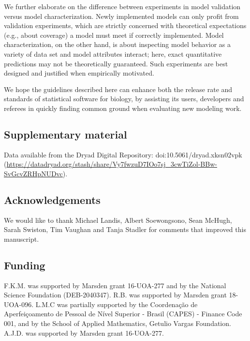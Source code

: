 \documentclass[oneside]{article}
\begin{document}
We further elaborate on the difference between experiments in model validation versus model characterization.
Newly implemented models can only profit from validation experiments, which are strictly concerned with theoretical expectations (e.g., about coverage) a model must meet if correctly implemented.
Model characterization, on the other hand, is about inspecting model behavior as a variety of data set and model attributes interact; here, exact quantitative predictions may not be theoretically guaranteed.
Such experiments are best designed and justified when empirically motivated.

We hope the guidelines described here can enhance both the release rate and standards of statistical software for biology, by assisting its users, developers and referees in quickly finding common ground when evaluating new modeling work.

\subsection*{Supplementary material}

Data available from the Dryad Digital Repository: doi:10.5061/dryad.xksn02vpk (\url{https://datadryad.org/stash/share/Vy7fwzuD7IOo7sj_3cwTiZol-BBw-SvGcvZRHpNUDvc}).

\subsection*{Acknowledgements}

We would like to thank Michael Landis, Albert Soewongsono, Sean McHugh, Sarah Swiston, Tim Vaughan and Tanja Stadler for comments that improved this manuscript.

\subsection*{Funding}
F.K.M. was supported by Marsden grant 16-UOA-277 and by the National Science Foundation (DEB-2040347).
R.B. was supported by Marsden grant 18-UOA-096.
L.M.C was partially supported by the Coordenação de Aperfeiçoamento de
Pessoal de Nível Superior - Brasil (CAPES) - Finance Code 001, and by the School of Applied Mathematics,  Getulio Vargas Foundation.
A.J.D. was supported by Marsden grant 16-UOA-277.



\end{document}

